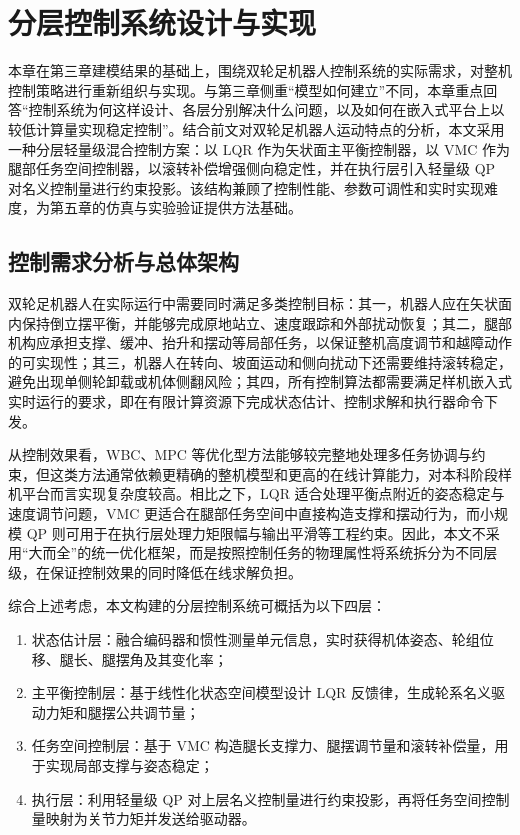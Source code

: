 \chapter{分层控制系统设计与实现}\label{chap:controller}

本章在第三章建模结果的基础上，围绕双轮足机器人控制系统的实际需求，对整机控制策略进行重新组织与实现。与第三章侧重“模型如何建立”不同，本章重点回答“控制系统为何这样设计、各层分别解决什么问题，以及如何在嵌入式平台上以较低计算量实现稳定控制”。结合前文对双轮足机器人运动特点的分析，本文采用一种分层轻量级混合控制方案：以 LQR 作为矢状面主平衡控制器，以 VMC 作为腿部任务空间控制器，以滚转补偿增强侧向稳定性，并在执行层引入轻量级 QP 对名义控制量进行约束投影。该结构兼顾了控制性能、参数可调性和实时实现难度，为第五章的仿真与实验验证提供方法基础。

\section{控制需求分析与总体架构}

双轮足机器人在实际运行中需要同时满足多类控制目标：其一，机器人应在矢状面内保持倒立摆平衡，并能够完成原地站立、速度跟踪和外部扰动恢复；其二，腿部机构应承担支撑、缓冲、抬升和摆动等局部任务，以保证整机高度调节和越障动作的可实现性；其三，机器人在转向、坡面运动和侧向扰动下还需要维持滚转稳定，避免出现单侧轮卸载或机体侧翻风险；其四，所有控制算法都需要满足样机嵌入式实时运行的要求，即在有限计算资源下完成状态估计、控制求解和执行器命令下发。

从控制效果看，WBC、MPC 等优化型方法能够较完整地处理多任务协调与约束，但这类方法通常依赖更精确的整机模型和更高的在线计算能力，对本科阶段样机平台而言实现复杂度较高。相比之下，LQR 适合处理平衡点附近的姿态稳定与速度调节问题，VMC 更适合在腿部任务空间中直接构造支撑和摆动行为，而小规模 QP 则可用于在执行层处理力矩限幅与输出平滑等工程约束。因此，本文不采用“大而全”的统一优化框架，而是按照控制任务的物理属性将系统拆分为不同层级，在保证控制效果的同时降低在线求解负担。

综合上述考虑，本文构建的分层控制系统可概括为以下四层：
\begin{enumerate}
  \item 状态估计层：融合编码器和惯性测量单元信息，实时获得机体姿态、轮组位移、腿长、腿摆角及其变化率；
  \item 主平衡控制层：基于线性化状态空间模型设计 LQR 反馈律，生成轮系名义驱动力矩和腿摆公共调节量；
  \item 任务空间控制层：基于 VMC 构造腿长支撑力、腿摆调节量和滚转补偿量，用于实现局部支撑与姿态稳定；
  \item 执行层：利用轻量级 QP 对上层名义控制量进行约束投影，再将任务空间控制量映射为关节力矩并发送给驱动器。
\end{enumerate}

